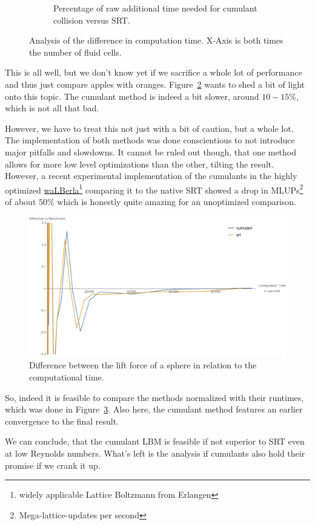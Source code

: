 \begin{figure}
\begin{subfigure}{.48\textwidth}
  \caption{Percentage of raw additional time needed for cumulant collision versus SRT.}
\label{fig: schaefer turek time percentage}
\end{subfigure}
\caption{Analysis of the difference in computation time. X-Axis is both times the number of fluid cells.}
\label{fig: time analysis cumulant vs SRT}
\end{figure}

This is all well, but we don't know yet if we sacrifice a whole lot of performance and thus just compare apples with oranges.
Figure~\ref{fig: time analysis cumulant vs SRT} wants to shed a bit of light onto this topic.
The cumulant method is indeed a bit slower, around $10-15\%$, which is not all that bad.

However, we have to treat this not just with a bit of caution, but a whole lot.
The implementation of both methods was done conscientious to not introduce major pitfalls and slowdowns.
It cannot be ruled out though, that one method allows for more low level optimizations than the other, tilting the result.
However, a recent experimental implementation of the cumulants in the highly optimized \href{http://walberla.net/index.html}{waLBerla}\footnote{widely applicable Lattice Boltzmann from Erlangen} comparing it to the native SRT showed a drop in MLUPs\footnote{Mega-lattice-updates per second} of about $50\%$ which is honestly quite amazing for an unoptimized comparison.

\begin{figure}
  \centering
  \includegraphics[width=\linewidth]{../figures/schaeferTurekLift_timeDifference.pdf} %
  \caption{Difference between the lift force of a sphere in relation to the computational time.}
\label{fig: schaefer turek time difference}
\end{figure}

So, indeed it is feasible to compare the methods normalized with their runtimes, which was done in Figure~\ref{fig: schaefer turek time difference}.
Also here, the cumulant method features an earlier convergence to the final result.
\par

We can conclude, that the cumulant LBM is feasible if not superior to SRT even at low Reynolds numbers.
What's left is the analysis if cumulants also hold their promise if we crank it up.
